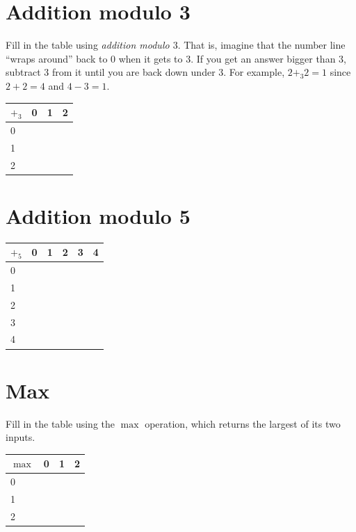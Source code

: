 \documentclass{article}
\begin{document}
\section*{Addition modulo 3}

Fill in the table using \emph{addition modulo $3$}.  That is, imagine
that the number line ``wraps around'' back to $0$ when it gets to
$3$.  If you get an answer bigger than $3$, subtract $3$ from it until
you are back down under $3$.  For example, $2 +_3 2 = 1$ since $2 + 2
= 4$ and $4 - 3 = 1$.

\begin{center}
\begin{tabular}{l|lll}
$+_3$ & 0 & 1 & 2 \\ \hline
0        &   &   &   \\
1        &   &   &   \\
2        &   &   &
\end{tabular}
\end{center}

\section*{Addition modulo 5}

\begin{center}
\begin{tabular}{l|lllll}
$+_5$ & 0 & 1 & 2 & 3 & 4 \\ \hline
0        &   &   &   &   &   \\
1        &   &   &   &   &   \\
2        &   &   &   &   &   \\
3        &   &   &   &   &   \\
4        &   &   &   &   &  
\end{tabular}
\end{center}

\section*{Max}

Fill in the table using the $\max$ operation, which returns the
largest of its two inputs.

\begin{center}
\begin{tabular}{l|lll}
$\max$ & 0 & 1 & 2 \\ \hline
0      &   &   &   \\
1      &   &   &   \\
2      &   &   &  
\end{tabular}
\end{center}
\end{document}
